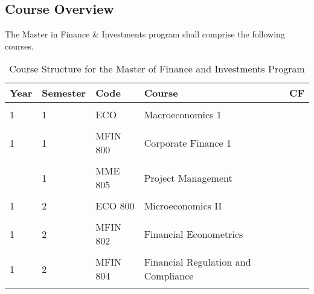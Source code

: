 \documentclass[16,a4paperpaper,]{article}
\begin{document}
\subsection{Course Overview}

The Master in Finance \& Investments program shall comprise the
following courses.

\begin{table}[!h]
\centering
\caption{\label{tab:unnamed-chunk-1}Course Structure for the Master of Finance and Investments Program}
\centering
\fontsize{12}{14}\selectfont
\begin{tabu} to 
\toprule
Year & Semester & Code & Course & CF\\
\midrule
{} &  &  &  & \\
1 & 1 & ECO & Macroeconomics 1 & \\
 &  &  &  & \\
1 & 1 & MFIN 800 & Corporate Finance 1 & \\
 &  &  &  & \\
 & 1 & MME 805 & Project Management & \\
 &  &  &  & \\
1 & 2 & ECO 800 & Microeconomics II & \\
 &  &  &  & \\
1 & 2 & MFIN 802 & Financial Econometrics & \\
\addlinespace
{} &  &  &  & \\
1 & 2 & MFIN 804 & Financial Regulation and Compliance & \\
 &  &  &  & \\

\end{tabu}
\end{table}
\end{document}
